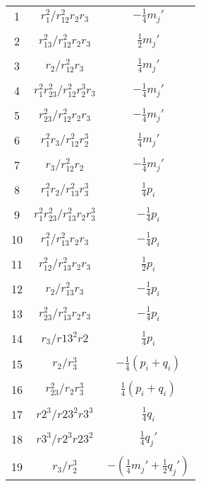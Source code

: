 \documentclass[Dissertation.tex]{subfiles}
\begin{document}
\begin{center}
\begin{longtable}{|c|c|c|}
1  & $r_1^2/r_{12}^2 r_2 r_3$  & $-\frac{1}{4} m_j'$ \\
&  &  \\
2  & $r_{13}^2/r_{12}^2 r_2 r_3$  & $\frac{1}{2} m_j'$ \\
&  &  \\
3  & $r_2/r_{12}^2 r_3$  & $\frac{1}{4} m_j'$ \\
&  &  \\
4  & $r_1^2 r_{23}^2/r_{12}^2 r_2^3 r_3$  & $-\frac{1}{4} m_j'$ \\
&  &  \\
5  & $r_{23}^2/r_{12}^2 r_2 r_3$  & $-\frac{1}{4} m_j'$ \\
&  &  \\
6  & $r_1^2 r_3/r_{12}^2 r_2^3$  & $\frac{1}{4} m_j'$ \\
&  &  \\
7  & $r_3/r_{12}^2 r_2$  & $-\frac{1}{4} m_j'$ \\
&  &  \\
8  & $r_1^2 r_2/r_{13}^2 r_3^3$  & $\frac{1}{4} p_i$ \\
&  &  \\
9  & $r_1^2 r_{23}^2/r_{13}^2 r_2 r_3^3$  & $-\frac{1}{4} p_i$ \\
&  &  \\
10  & $r_1^2/r_{13}^2 r_2 r_3$  & $-\frac{1}{4} p_i$ \\
&  &  \\
11  & $r_{12}^2/r_{13}^2 r_2 r_3$  & $\frac{1}{2} p_i$ \\
&  &  \\
12  & $r_2/r_{13}^2 r_3$  & $-\frac{1}{4} p_i$ \\
&  &  \\
13  & $r_{23}^2/r_{13}^2 r_2 r_3$  & $-\frac{1}{4} p_i$ \\
&  &  \\
14  & $r_3/r13^2 r2$  & $\frac{1}{4} p_i$ \\
&  &  \\
15  & $r_2/r_3^3$  & $-\frac{1}{4}(p_i + q_i)$ \\
&  &  \\
16  & $r_{23}^2/r_2 r_3^3$  & $\frac{1}{4}(p_i + q_i)$ \\
&  &  \\
17  & $r2^3/r23^2 r3^3$  & $\frac{1}{4} q_i$ \\
&  &  \\
18  & $r3^3/r2^3 r23^2$  & $\frac{1}{4} q_j'$ \\
&  &  \\
19  & $r_3/r_2^3$  & $-(\frac{1}{4} m_j' + \frac{1}{2} q_j')$ \\

\end{longtable}
\end{center}
\end{document}

